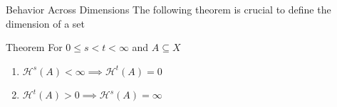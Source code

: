 \documentclass{beamer}
\DeclareMathOperator{\diam}{diam}
\begin{document}
\begin{frame}{Behavior Across Dimensions}
 The following theorem is crucial to define the dimension of a set
 \small{
 \begin{block}{Theorem}
    For $0 \le s<t<\infty$ and $A \subseteq X$
    \begin{enumerate}
        \item $\mathcal{H}^s(A) < \infty \implies \mathcal{H}^t(A) = 0$
        \item $\mathcal{H}^t(A)>0 \implies \mathcal{H}^s(A)=\infty$
    \end{enumerate}
 \end{block}
}
        

 \end{frame}
 
\end{document}
